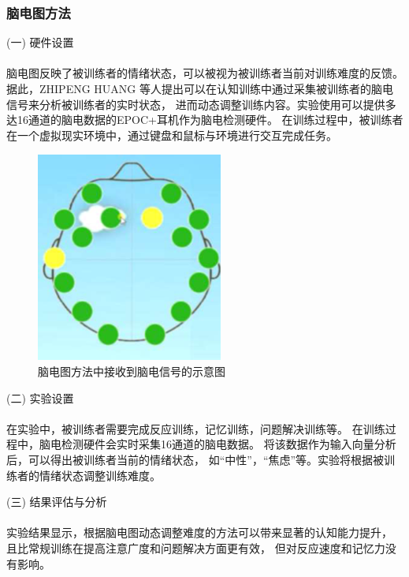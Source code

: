 \documentclass[12pt]{article}
\begin{document}
            \subsubsection{脑电图方法}
            (一) 硬件设置\paragraph{}
            脑电图反映了被训练者的情绪状态，可以被视为被训练者当前对训练难度的反馈。
            据此，ZHIPENG HUANG \cite{ref9}等人提出可以在认知训练中通过采集被训练者的脑电信号来分析被训练者的实时状态，
            进而动态调整训练内容。实验使用可以提供多达16通道的脑电数据的EPOC+耳机作为脑电检测硬件。
            在训练过程中，被训练者在一个虚拟现实环境中，通过键盘和鼠标与环境进行交互完成任务。
            \begin{figure}[H]
            	\centering
            	\includegraphics[scale=0.8]{images/brain_distribute.png}
            	\caption{脑电图方法中接收到脑电信号的示意图}
            	\label{fig:label}
            \end{figure}
            (二) 实验设置\paragraph{}
            在实验中，被训练者需要完成反应训练，记忆训练，问题解决训练等。
            在训练过程中，脑电检测硬件会实时采集16通道的脑电数据。
            将该数据作为输入向量分析后，可以得出被训练者当前的情绪状态，
            如“中性”，“焦虑”等。实验将根据被训练者的情绪状态调整训练难度。

            (三) 结果评估与分析\paragraph{}
            实验结果显示，根据脑电图动态调整难度的方法可以带来显著的认知能力提升，
            且比常规训练在提高注意广度和问题解决方面更有效，
            但对反应速度和记忆力没有影响。
\end{document}
